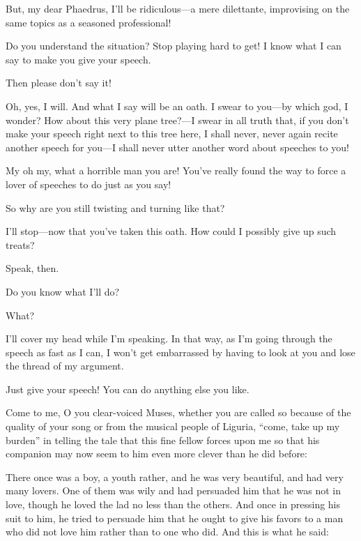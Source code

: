 \saysocrates But, my dear Phaedrus, I’ll be ridiculous---a mere dilettante,
improvising on the same topics as a seasoned professional!

\sayphaedrus Do you understand the situation? Stop playing hard to get! I
know what I can say to make you give your speech.

\saysocrates Then please don’t say it!

\sayphaedrus Oh, yes, I will. And what I say will be an oath. I swear to
you---by which god, I wonder? How about this very plane tree?---I swear 
in all truth that, if you don’t make your speech right next to
this tree here, I shall never, never again recite another speech for
you---I shall never utter another word about speeches to you!

\saysocrates My oh my, what a horrible man you are! You’ve really found the
way to force a lover of speeches to do just as you say!

\sayphaedrus So why are you still twisting and turning like that?

\saysocrates I’ll stop---now that you’ve taken this oath. How could I
possibly give up such treats?

\sayphaedrus Speak, then.

\saysocrates Do you know what I’ll do?

\sayphaedrus What?

\saysocrates I’ll cover my head while I’m speaking. In that way, as I’m
going through the speech as fast as I can, I won’t get embarrassed by
having to look at you and lose the thread of my argument.

\sayphaedrus Just give your speech! You can do anything else you like.

\saysocrates Come to me, O you clear-voiced Muses, whether you are called
so because of the quality of your song or from the musical people of
Liguria, “come, take up my burden” in telling the tale that this fine fellow forces upon me
so that his companion may now seem to him even more clever than
he did before:

There once was a boy, a youth rather, and he was very beautiful, and had
very many lovers. One of them was wily and had persuaded him that he was
not in love, though he loved the lad no less than the others. And once
in pressing his suit to him, he tried to persuade him that he ought to
give his favors to a man who did not love him rather than to one who
did. And this is what he said:

